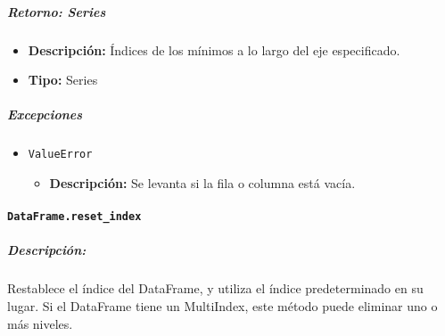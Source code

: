\subparagraph{\textbf{Retorno:} Series}
\begin{itemize}
    \item \textbf{Descripción:} Índices de los mínimos a lo largo del eje
          especificado.
    \item \textbf{Tipo:} Series
\end{itemize}

\subparagraph{\textbf{Excepciones}}
\begin{itemize}
    \item \texttt{ValueError}
          \begin{itemize}
              \item \textbf{Descripción:} Se levanta si la fila o columna está
                    vacía.
          \end{itemize}
\end{itemize}

\paragraph{\texttt{DataFrame.reset\_index}}

\subparagraph{Descripción:}
Restablece el índice del DataFrame, y utiliza el índice predeterminado en su
lugar.
Si el DataFrame tiene un MultiIndex, este método puede eliminar uno o más
niveles.

